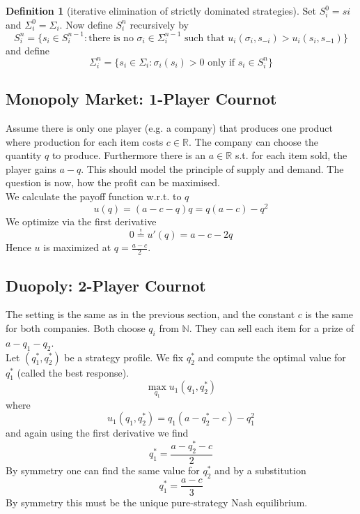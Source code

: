 \documentclass[a4paper, 12pt]{article}
\theoremstyle{plain}
\theoremstyle{definition}
\newtheorem{definition}[theorem]{Definition} %
\theoremstyle{lemma}
\theoremstyle{remark}
\theoremstyle{corollary}
\theoremstyle{example}
\begin{document}
	\begin{definition}[iterative elimination of strictly dominated strategies]
		Set $S_i^0 = si$ and $\Sigma_i^0 = \Sigma_i$. Now define $S_i^n$ recursively by \[S_i^n = \{s_i \in S_i^{n-1}: \text{there is no } \sigma_i \in \Sigma_i^{n-1} \text{ such that } u_i(\sigma_i,s_{-i}) > u_i(s_i,s_{-1})\}\] and define \[\Sigma_i^n = \{s_i \in \Sigma_i : \sigma_i(s_i)> 0 \text{ only if } s_i\in S_i^n\}\]
	\end{definition}
	\subsection{Monopoly Market: 1-Player Cournot}
	Assume there is only one player (e.g. a company) that produces one product where production for each item costs $c \in \mathbb{R}$. The company can choose the quantity $q$ to produce. Furthermore there is an $a \in \mathbb{R}$ s.t. for each item sold, the player gains $a-q$. This should model the principle of supply and demand. The question is now, how the profit can be maximised.\\
	We calculate the payoff function w.r.t. to $q$ \[u(q) = (a-c-q)q = q(a-c) - q^2\] We optimize via the first derivative \[0 \overset{!}{=} u'(q) = a-c-2q\] Hence $u$ is maximized at $q = \frac{a-c}{2}$.
	\subsection{Duopoly: 2-Player Cournot}
	The setting is the same as in the previous section, and the constant $c$ is the same for both companies. Both choose $q_i$ from $\mathbb{N}$. They can sell each item for a prize of $a-q_1-q_2$.\\
	Let $(q_1^*,q_2^*)$ be a strategy profile. We fix $q_2^*$ and compute the optimal value for $q_1^*$ (called the best response). \[\max_{q_1} u_1(q_1,q_2^*)\] where \[u_1(q_1,q_2^*) = q_1(a-q_2^*-c)-q_1^2\] and again using the first derivative we find \[q_1^* = \frac{a-q_2^*-c}{2}\] By symmetry one can find the same value for $q_2^*$ and by a substitution \[q_1^* = \frac{a-c}{3}\] By symmetry this must be the unique pure-strategy Nash equilibrium.
\end{document}
